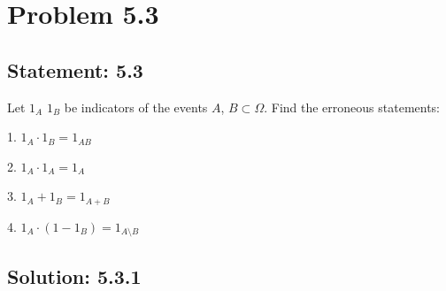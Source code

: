 \section*{Problem 5.3}

\subsection*{Statement: 5.3}

Let $1_A$ $1_B$ be indicators of the events $A$, $B \subset \Omega$. Find the erroneous statements:

1. $1_A \cdot 1_B = 1_{AB}$

2. $1_A \cdot 1_A = 1_A$

3. $1_A + 1_B = 1_{A+B}$

4. $1_A \cdot (1 - 1_B) = 1_{A\setminus B}$


\subsection*{Solution: 5.3.1}
